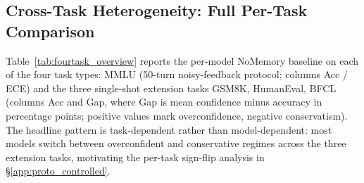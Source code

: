 \documentclass[11pt]{article}
\begin{document}
\subsection{Cross-Task Heterogeneity: Full Per-Task Comparison}
\label{app:fourtask}

Table~\ref{tab:fourtask_overview} reports the per-model NoMemory baseline on each of the four task types: MMLU (50-turn noisy-feedback protocol; columns Acc / ECE) and the three single-shot extension tasks GSM8K, HumanEval, BFCL (columns Acc and Gap, where Gap is mean confidence minus accuracy in percentage points; positive values mark overconfidence, negative conservatism). The headline pattern is task-dependent rather than model-dependent: most models switch between overconfident and conservative regimes across the three extension tasks, motivating the per-task sign-flip analysis in \S\ref{app:proto_controlled}.
\end{document}
